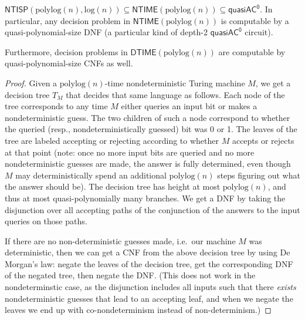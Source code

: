 \documentclass{theoretics}
\newcommand*{\ComplexityClass}[1]{\ensuremath{\mathsf{#1}}\xspace}
\newcommand{\NTISP}{\ComplexityClass{NTISP}}
\newcommand{\NTISPpll}{\ensuremath{\NTISP(\mathrm{polylog}(n),\mathrm{log}(n))}\xspace}
\newcommand{\qACz}{\ComplexityClass{quasiAC^0}}
\newcommand{\DTIME}{\ComplexityClass{DTIME}}
\newcommand{\NTIME}{\ComplexityClass{NTIME}}
\begin{document}
\begin{fact}\label{fact:NTISP} 
$\NTISPpll \subseteq \NTIME(\mathrm{polylog} (n)) \subseteq \qACz$. In particular, any decision problem in $\NTIME(\mathrm{polylog} (n))$ is computable by 
a quasi-polynomial-size DNF (a particular kind of depth-2 $\qACz$ circuit).

Furthermore, decision problems in $\DTIME(\mathrm{polylog} (n))$ are computable by quasi-polynomial-size CNFs as well.
\end{fact}

\begin{proof}
Given a $\mathrm{polylog} (n)$-time nondeterministic Turing machine $M$, we get a decision tree $T_M$ that decides that same language as follows. Each node of the tree corresponds to any time $M$ either queries an input bit or makes a nondeterministic guess. The two children of such a node correspond to whether the queried (resp., nondeterministically guessed) bit was 0 or 1. The leaves of the tree are labeled accepting or rejecting according to whether $M$ accepts or rejects at that point (note: once no more input bits are queried and no more nondeterministic guesses are made, the answer is fully determined, even though $M$ may deterministically spend an additional $\mathrm{polylog} (n)$ steps figuring out what the answer should be). The decision tree has height at most $\mathrm{polylog} (n)$, and thus at most quasi-polynomially many branches. We get a DNF by taking the disjunction over all accepting paths of the conjunction of the answers to the input queries on those paths.

If there are no non-deterministic guesses made, i.e.\ our machine $M$ was deterministic, then we can get a CNF from the above decision tree by using De Morgan's law: negate the leaves of the decision tree, get the corresponding DNF of the negated tree, then negate the DNF. (This does not work in the nondeterminstic case, as the disjunction includes all inputs such that there \emph{exists} nondeterministic guesses that lead to an accepting leaf, and when we negate the leaves we end up with co-nondeterminism instead of non-determinism.)
\end{proof}
\end{document}
